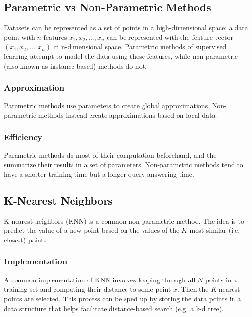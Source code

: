 \documentclass[12pt]{article}
\begin{document}
    \subsection{Parametric vs Non-Parametric Methods}
        Datasets can be represented as a set of points in a high-dimensional space; a data point with $n$ features $x_1,
        x_2, ..., x_n$ can be represented with the feature vector $(x_1, x_2, ..., x_n)$ in n-dimensional space.
        Parametric methods of supervised learning attempt to model the data using these features, while non-parametric
        (also known as instance-based) methods do not.

        \subsubsection{Approximation}
            Parametric methods use parameters to create global approximations. Non-parametric methods instead create
            approximations based on local data.

        \subsubsection{Efficiency}
            Parametric methods do most of their computation beforehand, and the summarize their results in a set of
            parameters. Non-parametric methods tend to have a shorter training time but a longer query answering time.

    \subsection{K-Nearest Neighbors} \label{sec:KNN} K-nearest neighbors (KNN) is a common non-parametric method. The
        idea is to predict the value of a new point based on the values of the $K$ most similar (i.e. closest) points.

        \subsubsection{Implementation}
            A common implementation of KNN involves looping through all $N$ points in a training set and computing their
            distance to some point $x$. Then the $K$ nearest points are selected. This process can be sped up by storing
            the data points in a data structure that helps facilitate distance-based search (e.g. a k-d tree).
\end{document}
